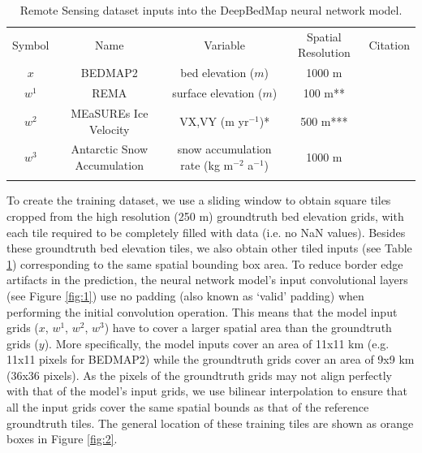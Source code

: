 \documentclass[tc, manuscript]{copernicus}
\begin{document}
\begin{table}[htbp]
  \caption{Remote Sensing dataset inputs into the DeepBedMap neural network model.}
  \label{table:datainputs}
  \begin{tabular}{ccccc}
  \tophline
  Symbol & Name & Variable & Spatial Resolution & Citation \\
  \middlehline
  $x$ & BEDMAP2 & bed elevation ($m$) & 1000 m & \cite{FretwellBedmap2improvedice2013} \\
  $w^1$ & REMA & surface elevation ($m$) & 100 m** & \cite{HowatReferenceElevationModel2018} \\
  $w^2$ & MEaSUREs Ice Velocity & VX,VY (m yr$^{-1}$)* & 500 m*** & \cite{MouginotContinentwideinterferometric2019} \\
  $w^3$ & Antarctic Snow Accumulation & snow accumulation rate (kg m$^{-2}$ a$^{-1}$) & 1000 m & \cite{ArthernAntarcticsnowaccumulation2006} \\
  \bottomhline
  \end{tabular}
\end{table}

To create the training dataset, we use a sliding window to obtain square tiles cropped from the high resolution (250 m) groundtruth bed elevation grids, with each tile required to be completely filled with data (i.e. no NaN values).
Besides these groundtruth bed elevation tiles, we also obtain other tiled inputs (see Table \ref{table:datainputs}) corresponding to the same spatial bounding box area.
To reduce border edge artifacts in the prediction, the neural network model's input convolutional layers (see Figure \ref{fig:1}) use no padding (also known as `valid' padding) when performing the initial convolution operation.
This means that the model input grids ($x$, $w^1$, $w^2$, $w^3$) have to cover a larger spatial area than the groundtruth grids ($y$).
More specifically, the model inputs cover an area of 11x11 km (e.g. 11x11 pixels for BEDMAP2) while the groundtruth grids cover an area of 9x9 km (36x36 pixels).
As the pixels of the groundtruth grids may not align perfectly with that of the model's input grids, we use bilinear interpolation to ensure that all the input grids cover the same spatial bounds as that of the reference groundtruth tiles.
The general location of these training tiles are shown as orange boxes in Figure \ref{fig:2}.
\end{document}
